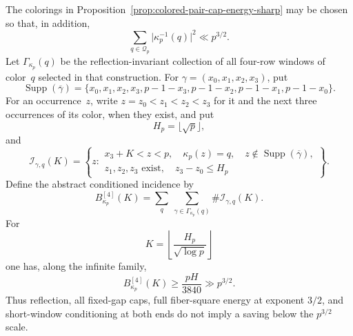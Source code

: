 \begin{corollary}
\label{cor:colored-far-incidence-sharp}
The colorings in Proposition~\ref{prop:colored-pair-cap-energy-sharp} may
be chosen so that, in addition,
\begin{equation}
 \sum_{q\in\mathscr Q_p}\bigl|\kappa_p^{-1}(q)\bigr|^2\ll p^{3/2}.
\label{eq:colored-full-fiber-energy}
\end{equation}
Let $\Gamma_{\kappa_p}(q)$ be the reflection-invariant collection of all
four-row windows of color~$q$ selected in that construction.  For
$\gamma=(x_0,x_1,x_2,x_3)$, put
\[
 \operatorname{Supp}(\overline\gamma)
 =\{x_0,x_1,x_2,x_3,
     p-1-x_3,p-1-x_2,p-1-x_1,p-1-x_0\}.
\]
For an occurrence~$z$, write $z=z_0<z_1<z_2<z_3$ for it and the next
three occurrences of its color, when they exist, and put
\[
 H_p=\lfloor\sqrt p\rfloor,
\]
and
\[
 \mathcal I_{\gamma,q}(K)
 =\left\{z:
  \begin{array}{c}
   x_3+K<z<p,\quad \kappa_p(z)=q,\quad
   z\notin\operatorname{Supp}(\overline\gamma),\\
   z_1,z_2,z_3\text{ exist},\quad z_3-z_0\le H_p
  \end{array}
  \right\}.
\]
Define the abstract conditioned incidence by
\[
 B_{\kappa_p}^{[4]}(K)
 =\sum_q\ \sum_{\gamma\in\Gamma_{\kappa_p}(q)}
  \#\mathcal I_{\gamma,q}(K).
\]
For
\[
 K=\left\lfloor\frac{H_p}{\sqrt{\log p}}\right\rfloor
\]
one has, along the infinite family,
\begin{equation}
 B_{\kappa_p}^{[4]}(K)\ge\frac{pH}{3840}\gg p^{3/2}.
\label{eq:colored-conditioned-incidence-lower}
\end{equation}
Thus reflection, all fixed-gap caps, full fiber-square energy at exponent
$3/2$, and short-window conditioning at both ends do not imply a saving
below the $p^{3/2}$ scale.
\end{corollary}

